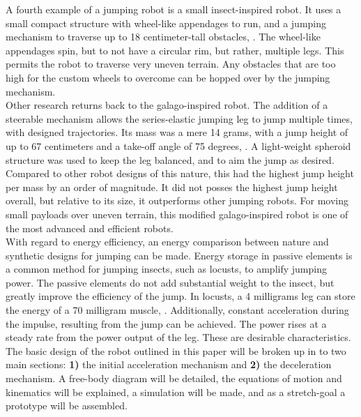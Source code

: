 \indent A fourth example of a jumping robot is a small insect-inspired robot. It uses a small compact structure with wheel-like appendages to run, and a jumping mechanism to traverse up to 18 centimeter-tall obstacles, \cite{lambrecht_small_2005}. The wheel-like appendages spin, but to not have a circular rim, but rather, multiple legs. This permits the robot to traverse very uneven terrain. Any obstacles that are too high for the custom wheels to overcome can be hopped over by the jumping mechanism. \\

\indent Other research returns back to the galago-inspired robot. The addition of a steerable mechanism allows the series-elastic jumping leg to jump multiple times, with designed trajectories. Its mass was a mere 14 grams, with a jump height of up to 67 centimeters and a take-off angle of 75 degrees, \cite{kovac_steerable_2010}. A light-weight spheroid structure was used to keep the leg balanced, and to aim the jump as desired. Compared to other robot designs of this nature, this had the highest jump height per mass by an order of magnitude. It did not posses the highest jump height overall, but relative to its size, it outperforms other jumping robots. For moving small payloads over uneven terrain, this modified galago-inspired robot is one of the most advanced and efficient robots.\\

\indent With regard to energy efficiency, an energy comparison between nature and synthetic designs for jumping can be made. Energy storage in passive elements is a common method for jumping insects, such as locusts, to amplify jumping power. The passive elements do not add substantial weight to the insect, but greatly improve the efficiency of the jump. In locusts, a 4 milligrams leg can store the energy of a 70 milligram muscle, \cite{bennet-clark_energetics_nodate}. Additionally, constant acceleration during the impulse, resulting from the jump can be achieved. The power rises at a steady rate from the power output of the leg. These are desirable characteristics. \\



\indent The basic design of the robot outlined in this paper will be broken up in to two main sections: \textbf{1)} the initial acceleration mechanism and \textbf{2)} the deceleration mechanism. A free-body diagram will be detailed, the equations of motion and kinematics will be explained, a simulation will be made, and as a stretch-goal a prototype will be assembled.\\